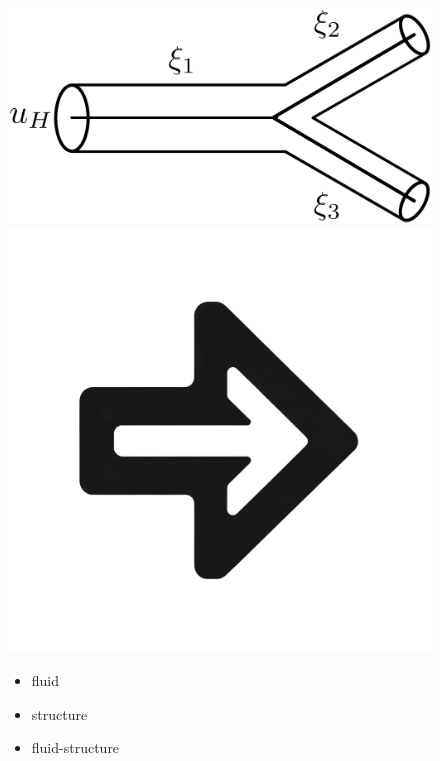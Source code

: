 \documentclass{beamer}
\begin{document}
\begin{frame}
\begin{figure}[htbp]
\begin{minipage}[c][0.33\paperheight][c]{\linewidth}
			\begin{minipage}{0.18\linewidth}
				\includegraphics[width=\linewidth]{images/bifurcation.eps}
			\end{minipage}
			\hfill
			\begin{minipage}{0.1\linewidth}
				\includegraphics[width=\linewidth]{images/right_arrow.png}
			\end{minipage}
			\hfill
			\begin{minipage}{0.18\linewidth}
				{\tiny
					\begin{itemize} 
						\item fluid 
						\item structure 
						\item fluid-structure

\end{itemize}}
\end{minipage}
\end{minipage}
\end{figure}
\end{frame}
\end{document}
